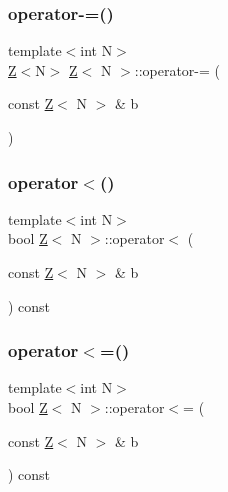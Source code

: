 \mbox{\label{classZ_ad7620de459cf2248f9f02e51fc5b5350}} 
\subsubsection{\texorpdfstring{operator-\/=()}{operator-=()}}
{\footnotesize\ttfamily template$<$int N$>$ \\
\hyperlink{classZ}{Z}$<$N$>$ \hyperlink{classZ}{Z}$<$ N $>$\+::operator-\/= (\begin{DoxyParamCaption}\item[{const \hyperlink{classZ}{Z}$<$ N $>$ \&}]{b }\end{DoxyParamCaption})\hspace{0.3cm}{\ttfamily [inline]}}

\mbox{\label{classZ_ac9464cf14368b566bd4897b7a83d0861}} 
\subsubsection{\texorpdfstring{operator$<$()}{operator<()}}
{\footnotesize\ttfamily template$<$int N$>$ \\
bool \hyperlink{classZ}{Z}$<$ N $>$\+::operator$<$ (\begin{DoxyParamCaption}\item[{const \hyperlink{classZ}{Z}$<$ N $>$ \&}]{b }\end{DoxyParamCaption}) const\hspace{0.3cm}{\ttfamily [inline]}}

\mbox{\label{classZ_a52b5a9afa8054c108b4967dfe2930642}} 
\subsubsection{\texorpdfstring{operator$<$=()}{operator<=()}}
{\footnotesize\ttfamily template$<$int N$>$ \\
bool \hyperlink{classZ}{Z}$<$ N $>$\+::operator$<$= (\begin{DoxyParamCaption}\item[{const \hyperlink{classZ}{Z}$<$ N $>$ \&}]{b }\end{DoxyParamCaption}) const\hspace{0.3cm}{\ttfamily [inline]}}

